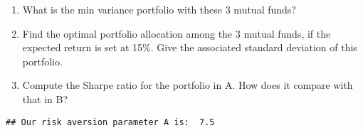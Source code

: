 \documentclass[11pt,]{article}
\newenvironment{Shaded}{\begin{snugshade}}{\end{snugshade}}
\newcommand{\KeywordTok}[1]{\textcolor[rgb]{0.13,0.29,0.53}{\textbf{#1}}}
\newcommand{\DataTypeTok}[1]{\textcolor[rgb]{0.13,0.29,0.53}{#1}}
\newcommand{\DecValTok}[1]{\textcolor[rgb]{0.00,0.00,0.81}{#1}}
\newcommand{\StringTok}[1]{\textcolor[rgb]{0.31,0.60,0.02}{#1}}
\newcommand{\CommentTok}[1]{\textcolor[rgb]{0.56,0.35,0.01}{\textit{#1}}}
\newcommand{\OperatorTok}[1]{\textcolor[rgb]{0.81,0.36,0.00}{\textbf{#1}}}
\newcommand{\NormalTok}[1]{#1}
\providecommand{\tightlist}{%
\setlength{\itemsep}{0pt}\setlength{\parskip}{0pt}}
\begin{document}
\begin{Shaded}
\end{Shaded}

\begin{enumerate}
\def\labelenumi{\arabic{enumi}.}
\tightlist
\item
  What is the min variance portfolio with these 3 mutual funds?
\item
  Find the optimal portfolio allocation among the 3 mutual funds, if the
  expected return is set at 15\%. Give the associated standard deviation
  of this portfolio.
\item
  Compute the Sharpe ratio for the portfolio in A. How does it compare
  with that in B?
\end{enumerate}

\begin{verbatim}
## Our risk aversion parameter A is:  7.5
\end{verbatim}
\end{document}
